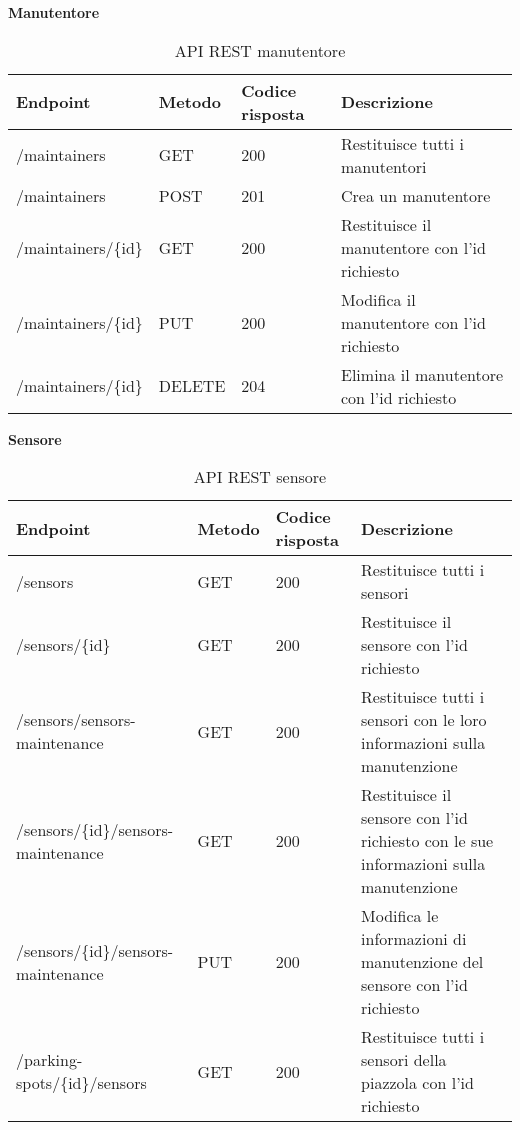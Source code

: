 \leavevmode\newline
\textbf{Manutentore}
\\
\begin{table}[H]
    \begin{tabular}{|p{3.2cm}|p{1.4cm}|p{1.4cm}|p{5.8cm}|} 
    \hline
    \textbf{Endpoint} & \textbf{Metodo} & \textbf{Codice risposta} & \textbf{Descrizione} \\ 
    \hline
    /maintainers & GET & 200 & Restituisce tutti i manutentori \\ 
    \hline
    /maintainers & POST & 201 & Crea un manutentore \\ 
    \hline
    /maintainers/\{id\} & GET & 200 & Restituisce il manutentore con l'id richiesto \\ 
    \hline
    /maintainers/\{id\} & PUT & 200 & Modifica il manutentore con l'id richiesto \\ 
    \hline
    /maintainers/\{id\} & DELETE & 204 & Elimina il manutentore con l'id richiesto \\ 
    \hline
    \end{tabular}
    \caption{API REST manutentore}
\end{table}
\leavevmode\newline
\clearpage
\textbf{Sensore}
\\
\begin{table}[H]
    \begin{tabular}{|p{3.2cm}|p{1.4cm}|p{1.4cm}|p{5.8cm}|} 
    \hline
    \textbf{Endpoint} & \textbf{Metodo} & \textbf{Codice risposta} & \textbf{Descrizione} \\ 
    \hline
    /sensors & GET & 200 & Restituisce tutti i sensori \\ 
    \hline
    /sensors/\{id\} & GET & 200 & Restituisce il sensore con l'id richiesto \\ 
    \hline
    /sensors/sensors-maintenance & GET & 200 & Restituisce tutti i sensori con le loro informazioni sulla 
        manutenzione \\ 
    \hline
    /sensors/\{id\}/sensors-maintenance & GET & 200 & Restituisce il sensore con l'id richiesto con le sue 
        informazioni sulla manutenzione \\ 
    \hline
    /sensors/\{id\}/sensors-maintenance & PUT & 200 & Modifica le informazioni di manutenzione del sensore con
        l'id richiesto \\ 
    \hline
    /parking-spots/\{id\}/sensors & GET & 200 & Restituisce tutti i sensori della piazzola con l'id richiesto \\ 
    \hline
    \end{tabular}
    \caption{API REST sensore}
\end{table}
